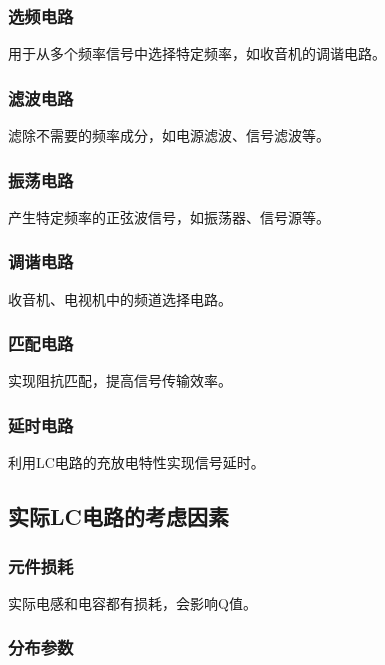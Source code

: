 \documentclass[12pt,UTF8]{ctexbook}
\begin{document}
\subsubsection{选频电路}

用于从多个频率信号中选择特定频率，如收音机的调谐电路。

\subsubsection{滤波电路}

滤除不需要的频率成分，如电源滤波、信号滤波等。

\subsubsection{振荡电路}

产生特定频率的正弦波信号，如振荡器、信号源等。

\subsubsection{调谐电路}

收音机、电视机中的频道选择电路。

\subsubsection{匹配电路}

实现阻抗匹配，提高信号传输效率。

\subsubsection{延时电路}

利用LC电路的充放电特性实现信号延时。

\subsection{实际LC电路的考虑因素}

\subsubsection{元件损耗}

实际电感和电容都有损耗，会影响Q值。

\subsubsection{分布参数}
\end{document}
